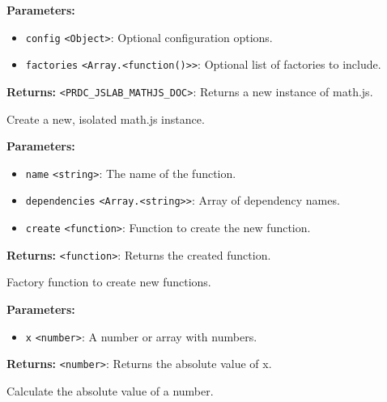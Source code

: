 \documentclass[12pt,a4paper]{article}
\begin{document}
\noindent \textbf{Parameters:}
\begin{itemize}
  \item \texttt{config} \texttt{<Object>}: Optional configuration options.
  \item \texttt{factories} \texttt{<Array.<function()>>}: Optional list of factories to include.
\end{itemize}

\noindent \textbf{Returns:} \texttt{<PRDC\_JSLAB\_MATHJS\_DOC>}: Returns a new instance of math.js.

\noindent Create a new, isolated math.js instance.

\vspace{5mm}
\noindent {}


\noindent \textbf{Parameters:}
\begin{itemize}
  \item \texttt{name} \texttt{<string>}: The name of the function.
  \item \texttt{dependencies} \texttt{<Array.<string>>}: Array of dependency names.
  \item \texttt{create} \texttt{<function>}: Function to create the new function.
\end{itemize}

\noindent \textbf{Returns:} \texttt{<function>}: Returns the created function.

\noindent Factory function to create new functions.

\vspace{5mm}
\noindent {}


\noindent \textbf{Parameters:}
\begin{itemize}
  \item \texttt{x} \texttt{<number>}: A number or array with numbers.
\end{itemize}

\noindent \textbf{Returns:} \texttt{<number>}: Returns the absolute value of \textasciigrave{}x\textasciigrave{}.

\noindent Calculate the absolute value of a number.

\vspace{5mm}
\noindent {}
\end{document}
